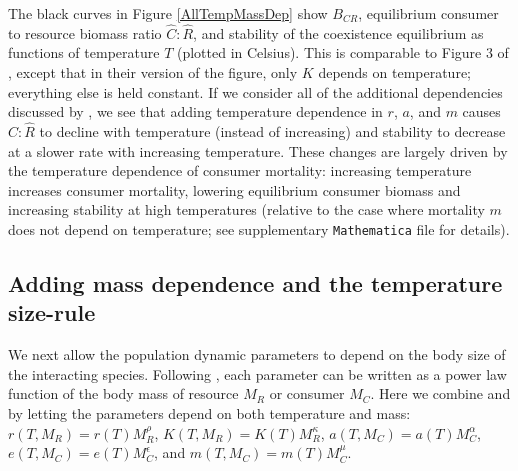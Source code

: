 \documentclass[11pt]{article}
\begin{document}
The black curves in Figure \ref{AllTempMassDep} show $B_{CR}$, equilibrium consumer to resource biomass ratio $\hat{C}:\hat{R}$, and stability of the coexistence equilibrium as functions of temperature $T$ (plotted in Celsius). This is comparable to Figure 3 of \citet{Gilbert2014}, except that in their version of the figure, only $K$ depends on temperature; everything else is held constant. If we consider all of the additional dependencies discussed by \citet{Gilbert2014}, we see that adding temperature dependence in $r$, $a$, and $m$ causes $\hat{C}:\hat{R}$ to decline with temperature (instead of increasing) and stability to decrease at a slower rate with increasing temperature.
These changes are largely driven by the temperature dependence of consumer mortality: increasing temperature increases consumer mortality, lowering equilibrium consumer biomass and increasing stability at high temperatures (relative to the case where mortality $m$ does not depend on temperature; see supplementary \texttt{Mathematica} file for details).
%
%

\subsection*{Adding mass dependence and the temperature size-rule}

We next allow the population dynamic parameters to depend on the body size of the interacting species.
Following \cite{DeLong2015}, each parameter can be written as a power law function of the body mass of resource $M_R$ or consumer $M_C$.
Here we combine \cite{DeLong2015} and \cite{Gilbert2014} by letting the parameters depend on both temperature and mass: $r(T, M_R) = r(T) M_R^\rho$, $K(T, M_R) = K(T) M_R^\kappa$, $a(T, M_C) = a(T) M_C^\alpha$, $e(T, M_C) = e(T) M_C^\epsilon$, and $m(T, M_C) = m(T) M_C^\mu$.
\end{document}
